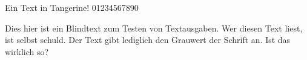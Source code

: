 \documentclass{article}
\begin{document}
\Huge

Ein Text in Tangerine! 01234567890

Dies hier ist ein Blindtext zum Testen von Textausgaben.
Wer diesen Text liest, ist selbst schuld. Der Text gibt lediglich
den Grauwert der Schrift an. Ist das wirklich so?
\end{document}
